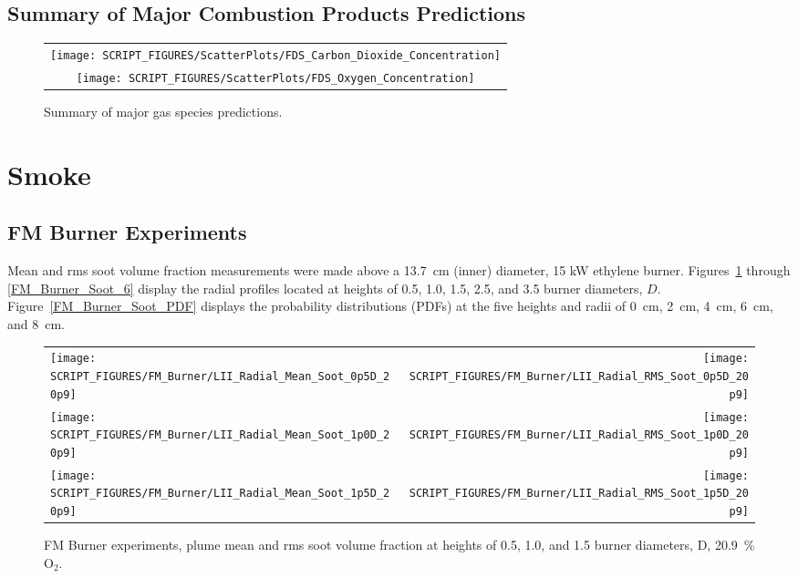 \clearpage


\subsection{Summary of Major Combustion Products Predictions}
\label{Carbon Dioxide Concentration}
\label{Oxygen Concentration}


\begin{figure}[!h]
\centering
\begin{tabular}{c}
\texttt{[image: SCRIPT\_FIGURES/ScatterPlots/FDS\_Carbon\_Dioxide\_Concentration]} \\
\texttt{[image: SCRIPT\_FIGURES/ScatterPlots/FDS\_Oxygen\_Concentration]}
\end{tabular}
\caption[Summary of major gas species predictions]
{Summary of major gas species predictions.}
\end{figure}

\clearpage


\section{Smoke}

\subsection{FM Burner Experiments}
\label{FM_Burner_Soot}

Mean and rms soot volume fraction measurements were made above a 13.7~cm (inner) diameter, 15 kW ethylene burner. Figures~\ref{FM_Burner_Soot_1} through \ref{FM_Burner_Soot_6} display the radial profiles located at heights of 0.5, 1.0, 1.5, 2.5, and 3.5 burner diameters, $D$. Figure~\ref{FM_Burner_Soot_PDF} displays the probability distributions (PDFs) at the five heights and radii of 0~cm, 2~cm, 4~cm, 6~cm, and 8~cm.

\begin{figure}[!h]
\begin{tabular*}{\textwidth}{l@{\extracolsep{\fill}}r}
\texttt{[image: SCRIPT\_FIGURES/FM\_Burner/LII\_Radial\_Mean\_Soot\_0p5D\_20p9]} &
\texttt{[image: SCRIPT\_FIGURES/FM\_Burner/LII\_Radial\_RMS\_Soot\_0p5D\_20p9]} \\
\texttt{[image: SCRIPT\_FIGURES/FM\_Burner/LII\_Radial\_Mean\_Soot\_1p0D\_20p9]} &
\texttt{[image: SCRIPT\_FIGURES/FM\_Burner/LII\_Radial\_RMS\_Soot\_1p0D\_20p9]} \\
\texttt{[image: SCRIPT\_FIGURES/FM\_Burner/LII\_Radial\_Mean\_Soot\_1p5D\_20p9]} &
\texttt{[image: SCRIPT\_FIGURES/FM\_Burner/LII\_Radial\_RMS\_Soot\_1p5D\_20p9]}
\end{tabular*}
\caption[FM Burner experiments, plume mean and rms soot volume fraction, 20.9~\% O$_2$]
{FM Burner experiments, plume mean and rms soot volume fraction at heights of 0.5, 1.0, and 1.5 burner diameters, D, 20.9~\% O$_2$.}
\label{FM_Burner_Soot_1}
\end{figure}

